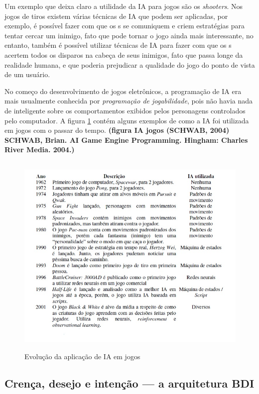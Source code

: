 Um exemplo que deixa claro a utilidade da IA para jogos são os \textit{shooters}. Nos jogos de tiros existem várias técnicas de IA que podem ser aplicadas, por exemplo, é possível fazer com que os \npc{}s se comuniquem e criem estratégias para tentar cercar um inimigo, fato que pode tornar o jogo ainda mais interessante, no entanto, também é possível utilizar técnicas de IA para fazer com que os \npc{}s acertem todos os disparos na cabeça de seus inimigos, fato que passa longe da realidade humana, e que poderia prejudicar a qualidade do jogo do ponto de vista de um usuário.

No começo do desenvolvimento de jogos eletrônicos, a programação de IA era mais usualmente conhecida por \textit{programação de jogabilidade}, pois não havia nada de inteligente sobre os comportamentos exibidos pelos personagens controlados pelo computador. 
A figura \ref{IA em jogos} contém alguns exemplos de como a IA foi utilizada em jogos com o passar do tempo.
\textbf{(figura IA jogos (SCHWAB, 2004) SCHWAB, Brian. AI Game Engine Programming. Hingham: Charles River Media. 2004.)}

\begin{figure}
\centering
\includegraphics [height=10cm]{figuras/evolucao_IA_jogos.jpg}
\caption{Evolução da aplicação de IA em jogos}
\label{IA em jogos}
\end{figure}


\subsection{Crença, desejo e intenção --- a arquitetura BDI}

